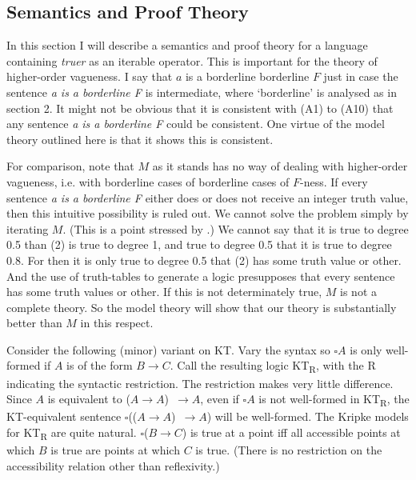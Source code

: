\hypertarget{semantics-and-proof-theory}{%
\subsection{Semantics and Proof
Theory}\label{semantics-and-proof-theory}}

In this section I will describe a semantics and proof theory for a
language containing \emph{truer} as an iterable operator. This is
important for the theory of higher-order vagueness. I say that \(a\) is
a borderline borderline \(F\) just in case the sentence \emph{a is a
borderline F} is intermediate, where `borderline' is analysed as in
section 2. It might not be obvious that it is consistent with (A1) to
(A10) that any sentence \emph{a is a borderline F} could be consistent.
One virtue of the model theory outlined here is that it shows this is
consistent.

For comparison, note that \(M\) as it stands has no way of dealing with
higher-order vagueness, i.e. with borderline cases of borderline cases
of \(F\)-ness. If every sentence \emph{a is a borderline F} either does
or does not receive an integer truth value, then this intuitive
possibility is ruled out. We cannot solve the problem simply by
iterating \(M\). (This is a point stressed by
\cite[Ch. 4]{Williamson1994-WILV}.) We cannot say that it is true to
degree 0.5 than (2) is true to degree 1, and true to degree 0.5 that it
is true to degree 0.8. For then it is only true to degree 0.5 that (2)
has some truth value or other. And the use of truth-tables to generate a
logic presupposes that every sentence has some truth values or other. If
this is not determinately true, \(M\) is not a complete theory. So the
model theory will show that our theory is substantially better than
\(M\) in this respect.

Consider the following (minor) variant on KT. Vary the syntax so
\(\square A\) is only well-formed if \(A\) is of the form
\(B \rightarrow C\). Call the resulting logic KT\textsubscript{R}, with
the R indicating the syntactic restriction. The restriction makes very
little difference. Since \(A\) is equivalent to
(\(A \rightarrow A\))~\(\rightarrow A\), even if \(\square A\) is not
well-formed in KT\textsubscript{R}, the KT-equivalent sentence
\(\square\)((\(A \rightarrow A\))~\(\rightarrow A\)) will be
well-formed. The Kripke models for KT\textsubscript{R} are quite
natural. \(\square\)(\(B \rightarrow C\)) is true at a point iff all
accessible points at which \(B\) is true are points at which \(C\) is
true. (There is no restriction on the accessibility relation other than
reflexivity.)

